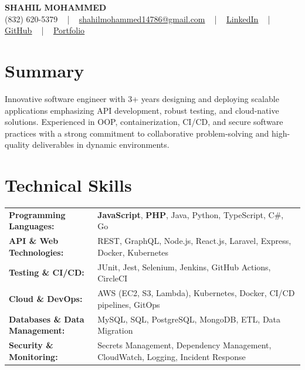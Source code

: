 \documentclass[letterpaper,11pt]{article}
\begin{document}
\begin{center}
    {\fontsize{14pt}{12pt}\selectfont \textbf{\MakeUppercase{Shahil Mohammed}}}\\ \vspace{2pt}
    \fontsize{10pt}{12pt}\selectfont (832) 620-5379 ~ | ~ \href{mailto:shahilmohammed14786@gmail.com}{shahilmohammed14786@gmail.com} ~ | ~  
    \href{https://www.linkedin.com/in/shahil-mohammed-9652931a1/}{\color{blue}\underline{LinkedIn}}  ~ | ~ 
    \href{https://github.com/freakbeast14}{\color{blue}\underline{GitHub}} ~ | ~ 
    \href{https://shahil-mohammed.netlify.app/}{\color{blue}\underline{Portfolio}}
    \vspace{-8pt}
\end{center}

\section{Summary}
\fontsize{9pt}{10pt}\selectfont
Innovative software engineer with 3+ years designing and deploying scalable applications emphasizing API development, robust testing, and cloud-native solutions. Experienced in OOP, containerization, CI/CD, and secure software practices with a strong commitment to collaborative problem-solving and high-quality deliverables in dynamic environments.
 \vspace{-5pt}
 
\section{Technical Skills}
        \vspace{-14pt}
        \begin{table}[h]
            \fontsize{9pt}{10pt}\selectfont
            \begin{tabular}{p{0.3\linewidth} p{0.7\linewidth}}
                \textbf{Programming Languages:} & \textbf{JavaScript}, \textbf{PHP}, Java, Python, TypeScript, C\#, Go \\
                \textbf{API \& Web Technologies:} & REST, GraphQL, Node.js, React.js, Laravel, Express, Docker, Kubernetes \\
                \textbf{Testing \& CI/CD:} & JUnit, Jest, Selenium, Jenkins, GitHub Actions, CircleCI \\
                \textbf{Cloud \& DevOps:} & AWS (EC2, S3, Lambda), Kubernetes, Docker, CI/CD pipelines, GitOps \\
                \textbf{Databases \& Data Management:} & MySQL, SQL, PostgreSQL, MongoDB, ETL, Data Migration \\
                \textbf{Security \& Monitoring:} & Secrets Management, Dependency Management, CloudWatch, Logging, Incident Response \\
            \end{tabular}
        \end{table}
 \vspace{-15pt}
 
\end{document}
